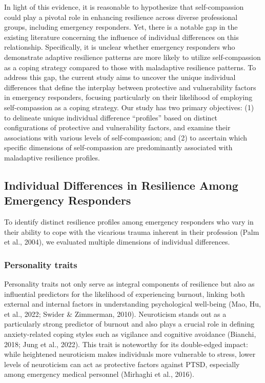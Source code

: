 \documentclass[
  man]{apa7}
\begin{document}
In light of this evidence, it is reasonable to hypothesize that self-compassion could play a pivotal role in enhancing resilience across diverse professional groups, including emergency responders. Yet, there is a notable gap in the existing literature concerning the influence of individual differences on this relationship. Specifically, it is unclear whether emergency responders who demonstrate adaptive resilience patterns are more likely to utilize self-compassion as a coping strategy compared to those with maladaptive resilience patterns. To address this gap, the current study aims to uncover the unique individual differences that define the interplay between protective and vulnerability factors in emergency responders, focusing particularly on their likelihood of employing self-compassion as a coping strategy. Our study has two primary objectives: (1) to delineate unique individual difference ``profiles'' based on distinct configurations of protective and vulnerability factors, and examine their associations with various levels of self-compassion; and (2) to ascertain which specific dimensions of self-compassion are predominantly associated with maladaptive resilience profiles.

\hypertarget{individual-differences-in-resilience-among-emergency-responders}{%
\subsection{Individual Differences in Resilience Among Emergency Responders}\label{individual-differences-in-resilience-among-emergency-responders}}

To identify distinct resilience profiles among emergency responders who vary in their ability to cope with the vicarious trauma inherent in their profession (Palm et al., 2004), we evaluated multiple dimensions of individual differences.

\hypertarget{personality-traits}{%
\subsubsection{Personality traits}\label{personality-traits}}

Personality traits not only serve as integral components of resilience but also as influential predictors for the likelihood of experiencing burnout, linking both external and internal factors in understanding psychological well-being (Mao, Hu, et al., 2022; Swider \& Zimmerman, 2010). Neuroticism stands out as a particularly strong predictor of burnout and also plays a crucial role in defining anxiety-related coping styles such as vigilance and cognitive avoidance (Bianchi, 2018; Jung et al., 2022). This trait is noteworthy for its double-edged impact: while heightened neuroticism makes individuals more vulnerable to stress, lower levels of neuroticism can act as protective factors against PTSD, especially among emergency medical personnel (Mirhaghi et al., 2016).
\end{document}
